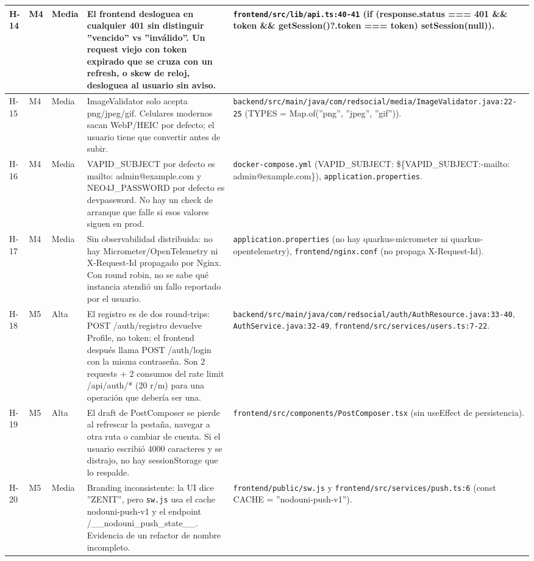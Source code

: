 \documentclass[10pt,a4paper]{article}
\newcommand{\code}[1]{\nolinkurl{#1}}
\begin{document}
\begin{xltabular}{\textwidth}{p{1.0cm} p{1.1cm} p{1.6cm} X >{\raggedright\arraybackslash}p{4.7cm}}
H-14 & M4 & Media & El frontend desloguea en cualquier 401 sin distinguir ''vencido'' vs ''inválido''. Un request viejo con token expirado que se cruza con un refresh, o skew de reloj, desloguea al usuario sin aviso. & \code{frontend/src/lib/api.ts:40-41} (if (response.status === 401 \&\& token \&\& getSession()?.token === token) setSession(null)). \\ \midrule
H-15 & M4 & Media & ImageValidator solo acepta png/jpeg/gif. Celulares modernos sacan WebP/HEIC por defecto; el usuario tiene que convertir antes de subir. & \code{backend/src/main/java/com/redsocial/media/ImageValidator.java:22-25} (TYPES = Map.of(''png'', ''jpeg'', ''gif'')). \\ \midrule
H-16 & M4 & Media & VAPID\_SUBJECT por defecto es mailto: admin@example.com y NEO4J\_PASSWORD por defecto es devpassword. No hay un check de arranque que falle si esos valores siguen en prod. & \code{docker-compose.yml} (VAPID\_SUBJECT: \$\{VAPID\_SUBJECT:-mailto: admin@example.com\}), \code{application.properties}. \\ \midrule
H-17 & M4 & Media & Sin observabilidad distribuida: no hay Micrometer/OpenTelemetry ni X-Request-Id propagado por Nginx. Con round robin, no se sabe qué instancia atendió un fallo reportado por el usuario. & \code{application.properties} (no hay quarkus-micrometer ni quarkus-opentelemetry), \code{frontend/nginx.conf} (no propaga X-Request-Id). \\ \midrule
H-18 & M5 & Alta & El registro es de dos round-trips: POST /auth/registro devuelve Profile, no token; el frontend después llama POST /auth/login con la misma contraseña. Son 2 requests + 2 consumos del rate limit /api/auth/* (20 r/m) para una operación que debería ser una. & \code{backend/src/main/java/com/redsocial/auth/AuthResource.java:33-40}, \code{AuthService.java:32-49}, \code{frontend/src/services/users.ts:7-22}. \\ \midrule
H-19 & M5 & Alta & El draft de PostComposer se pierde al refrescar la pestaña, navegar a otra ruta o cambiar de cuenta. Si el usuario escribió 4000 caracteres y se distrajo, no hay sessionStorage que lo respalde. & \code{frontend/src/components/PostComposer.tsx} (sin useEffect de persistencia). \\ \midrule
H-20 & M5 & Media & Branding inconsistente: la UI dice ''ZENIT'', pero \code{sw.js} usa el cache nodouni-push-v1 y el endpoint /\_\_nodouni\_push\_state\_\_. Evidencia de un refactor de nombre incompleto. & \code{frontend/public/sw.js} y \code{frontend/src/services/push.ts:6} (const CACHE = ''nodouni-push-v1''). \\ \midrule

\end{xltabular}
\end{document}
